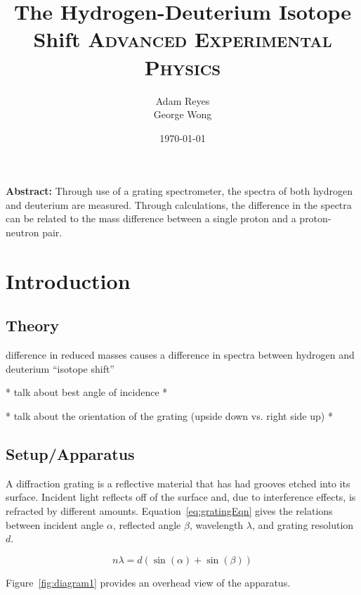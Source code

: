 \documentclass[paper=a4, fontsize=11pt]{scrartcl} %
\title{	
The Hydrogen-Deuterium Isotope Shift
\horrule{0.5pt}
\normalfont \normalsize 
\textsc{Advanced Experimental Physics }
}
\author{Adam Reyes \\ George Wong} %
\date{\normalsize\today} %
\numberwithin{equation}{section}
\numberwithin{figure}{section}
\numberwithin{table}{section}
\begin{document}
\maketitle



\textbf{Abstract:}
Through use of a grating spectrometer, the spectra of both hydrogen and deuterium are measured. Through calculations, the difference in the spectra can be related to the mass difference between a single proton and a proton-neutron pair.

\section{Introduction}

\subsection{Theory}

difference in reduced masses causes a difference in spectra between hydrogen and deuterium ``isotope shift''



* talk about best angle of incidence *

* talk about the orientation of the grating (upside down vs. right side up) *

\subsection{Setup/Apparatus}

A diffraction grating is a reflective material that has had grooves etched into its surface. Incident light reflects off of the surface and, due to interference effects, is refracted by different amounts. Equation~\ref{eq:gratingEqn} gives the relations between incident angle $\alpha$, reflected angle $\beta$, wavelength $\lambda$, and grating resolution $d$.

\begin{equation} \label{eq:gratingEqn}
n \lambda = d ( \sin(\alpha) + \sin(\beta))
\end{equation}

Figure~\ref{fig:diagram1} provides an overhead view of the apparatus.
\end{document}
